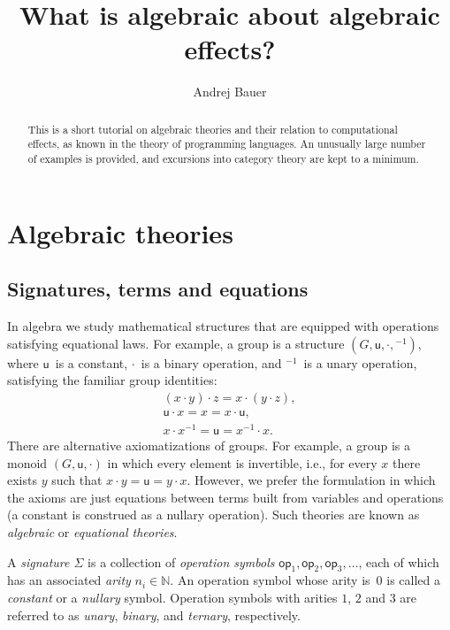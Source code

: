 \documentclass{amsart}
\newcommand{\NN}{\mathbb{N}}
\newcommand{\op}{\mathsf{op}}
\begin{document}
\title{What is algebraic about algebraic effects?}

\author{Andrej Bauer}

\begin{abstract}
  This is a short tutorial on algebraic theories and their relation to computational
  effects, as known in the theory of programming languages. An unusually large number of
  examples is provided, and excursions into category theory are kept to a minimum.
\end{abstract}

\maketitle

\section{Algebraic theories}
\label{sec:algebraic-theories}


\subsection{Signatures, terms and equations}
\label{sec:signatures-equations}

In algebra we study mathematical structures that are equipped with operations satisfying
equational laws. For example, a group is a structure $(G, \mathsf{u}, {\cdot}, {}^{-1})$,
where $\mathsf{u}$~is a constant, $\cdot$~is a binary operation, and ${}^{-1}$~is a unary
operation, satisfying the familiar group identities:
%
\begin{gather*}
  (x \cdot y) \cdot z = x \cdot (y \cdot z),\\
  \mathsf{u} \cdot x = x = x \cdot \mathsf{u},\\
  x \cdot x^{-1} = \mathsf{u} = x^{-1} \cdot x.
\end{gather*}
%
There are alternative axiomatizations of groups. For example, a group is a monoid
$(G, \mathsf{u}, {\cdot})$ in which every element is invertible, i.e., for every $x$ there
exists $y$ such that $x \cdot y = \mathsf{u} = y \cdot x$. However, we prefer the
formulation in which the axioms are just equations between terms built from variables and
operations (a constant is construed as a nullary operation). Such theories are known as
\emph{algebraic} or \emph{equational theories}.

A \emph{signature $\Sigma$} is a collection of \emph{operation symbols}
$\op_1, \op_2, \op_3, \ldots$, each of which has an associated \emph{arity} $n_i \in \NN$.
An operation symbol whose arity is~$0$ is called a \emph{constant} or a \emph{nullary}
symbol. Operation symbols with arities $1$, $2$ and $3$ are referred to as \emph{unary},
\emph{binary}, and \emph{ternary}, respectively.
\end{document}
